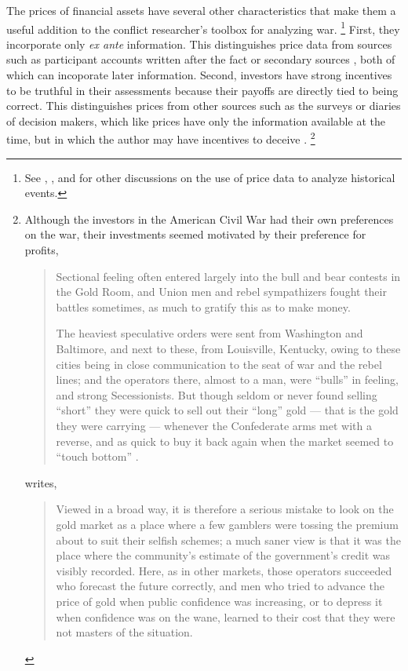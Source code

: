 The prices of financial assets have several other characteristics that make them a useful addition to the conflict researcher's toolbox for analyzing war.
\footnote{See \textcite{WillardGuinnaneEtAl1996}, \textcite{north2000introd}, and \textcite{FreyKucher2000} for other  discussions on the use of price data to analyze historical events.} %
First, they incorporate only \textit{ex ante} information.
This distinguishes price data from sources such as participant accounts written after the fact or secondary sources \parencites[1001]{WillardGuinnaneEtAl1996}[][188]{FreyKucher2000a}, both of which can incoporate later information.
Second, investors have strong incentives to be truthful in their assessments because their payoffs are directly tied to being correct.
This distinguishes prices from other sources such as the surveys or diaries of decision makers, which like prices have only the information available at the time, but in which the author may have incentives to deceive \parencite[57]{Reiter2009}.%
\footnote{
  Although the investors in the American Civil War had their own preferences on the war, their investments seemed motivated by their preference for profits,
  \begin{quote}
    Sectional feeling often entered largely into the bull and bear  contests in the Gold Room, and Union men and rebel sympathizers fought their battles sometimes, as much to gratify this as to make money.
    \textcite[7]{Cornwallis1879}

    The heaviest speculative orders were sent from Washington and Baltimore, and next to these, from Louisville, Kentucky, owing to these cities being in close communication to the seat of war and the rebel lines; and the operators there, almost to a man, were ``bulls'' in feeling, and strong Secessionists.
    But though seldom or never found selling ``short'' they were quick to sell out their ``long'' gold --- that is the gold they were carrying --- whenever the Confederate arms met with a reverse, and as quick to buy it back again when the market seemed to ``touch bottom'' \textcite[5]{Cornwallis1879}.
  \end{quote}
  \textcite[210]{Mitchell1903} writes,
  \begin{quote}
    Viewed in a broad way, it is therefore a serious mistake to look on the gold market as a place where a few gamblers were tossing the premium about to suit their selfish schemes; a much saner view is that it was the place where the community's estimate of the government's credit was visibly recorded.
    Here, as in other markets, those operators succeeded who forecast the future correctly, and men who tried to advance the price of gold when public confidence was increasing, or to depress it when confidence was on the wane, learned to their cost that they were not masters of the situation.
  \end{quote}
} %
